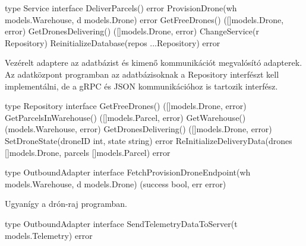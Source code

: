 \begin{python}
    type Service interface {
        DeliverParcels() error
        ProvisionDrone(wh models.Warehouse, d models.Drone) error
        GetFreeDrones() ([]models.Drone, error)
        GetDronesDelivering() ([]models.Drone, error)
        ChangeService(r Repository)
        ReinitializeDatabase(repos ...Repository) error
    }
\end{python}
Vezérelt adaptere az adatbázist és kimenő kommunikációt megvalósító adapterek.
Az adatközpont programban az adatbázisoknak a Repository interfészt kell implementálni, de a gRPC és JSON kommunikációhoz is tartozik interfész.
\begin{python}
    type Repository interface {
        GetFreeDrones() ([]models.Drone, error)
        GetParcelsInWarehouse() ([]models.Parcel, error)
        GetWarehouse() (models.Warehouse, error)
        GetDronesDelivering() ([]models.Drone, error)
        SetDroneState(droneID int, state string) error
        ReInitializeDeliveryData(drones []models.Drone, parcels []models.Parcel) error
    }

    type OutboundAdapter interface {
        FetchProvisionDroneEndpoint(wh models.Warehouse, d models.Drone) (success bool, err error)
    }
\end{python}

Ugyanígy a drón-raj programban.
\begin{python}
    type OutboundAdapter interface {
        SendTelemetryDataToServer(t models.Telemetry) error
    }
\end{python}
